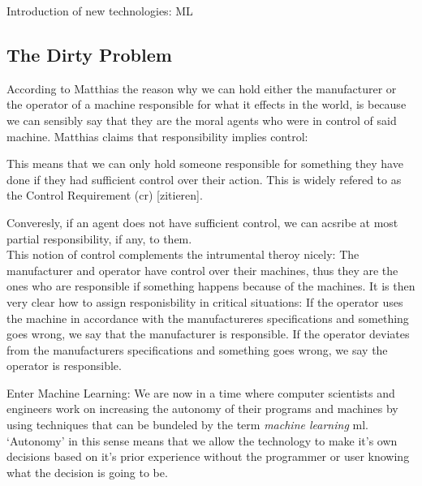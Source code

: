 \documentclass{article}
\begin{document}
Introduction of new technologies: ML

\subsection{The Dirty Problem}

According to Matthias \cite{Matthias_2004} the reason why we can hold either the
manufacturer or the operator of a machine responsible for what it effects in the
world, is because we can sensibly say that they are the moral agents who were in
control of said machine. Matthias claims that responsibility implies control:

\vspace{.8em}
 \cite[p.175]{Matthias_2004}

\vspace{.8em}
This means that we can only hold someone responsible for something they have
done if they had sufficient control over their action.
This is widely refered to as the Control Requirement (\acrshort{cr}) [zitieren].

Converesly, if an agent does not have sufficient control, we can acsribe at most
partial responsibility, if any, to them.\\
This notion of control complements the intrumental theroy nicely: The
manufacturer and operator have control over their machines, thus they are the
ones who are responsible if something happens because of the machines.
It is then very clear how to assign responisbility in critical situations: If the operator uses the
machine in accordance with the manufactureres specifications and something goes
wrong, we say that the manufacturer is responsible. If the operator deviates
from the manufacturers specifications and something goes wrong, we say the
operator is responsible.

Enter Machine Learning:
We are now in a time where computer scientists and engineers work on increasing
the autonomy of their programs and machines by using techniques that can be
bundeled by the term \textit{machine learning} \acrshort{ml}. `Autonomy' in this sense
means that we allow the technology to make it's own decisions based on it's
prior experience without the programmer or user knowing what the decision is
going to be. 
\end{document}
